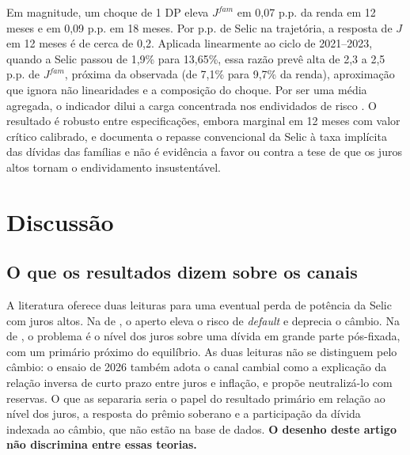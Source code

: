\documentclass[12pt,a4paper]{article}
\begin{document}
Em magnitude, um choque de 1 DP eleva $J^{fam}$ em 0,07 p.p. da renda em 12 meses e em 0,09 p.p. em 18 meses. Por p.p. de Selic na trajetória, a resposta de $J$ em 12 meses é de cerca de 0,2. Aplicada linearmente ao ciclo de 2021--2023, quando a Selic passou de 1,9\% para 13,65\%, essa razão prevê alta de 2,3 a 2,5 p.p. de $J^{fam}$, próxima da observada (de 7,1\% para 9,7\% da renda), aproximação que ignora não linearidades e a composição do choque. Por ser uma média agregada, o indicador dilui a carga concentrada nos endividados de risco \citep{bcb2020ee80}. O resultado é robusto entre especificações, embora marginal em 12 meses com valor crítico calibrado, e documenta o repasse convencional da Selic à taxa implícita das dívidas das famílias e não é evidência a favor ou contra a tese de que os juros altos tornam o endividamento insustentável.

\section{Discussão}

\subsection{O que os resultados dizem sobre os canais}

A literatura oferece duas leituras para uma eventual perda de potência da Selic com juros altos. Na de \citet{blanchard2005fiscal}, o aperto eleva o risco de \textit{default} e deprecia o câmbio. Na de \citet{resende2026euacuso}, o problema é o nível dos juros sobre uma dívida em grande parte pós-fixada, com um primário próximo do equilíbrio. As duas leituras não se distinguem pelo câmbio: o ensaio de 2026 também adota o canal cambial como a explicação da relação inversa de curto prazo entre juros e inflação, e propõe neutralizá-lo com reservas. O que as separaria seria o papel do resultado primário em relação ao nível dos juros, a resposta do prêmio soberano e a participação da dívida indexada ao câmbio, que não estão na base de dados. \textbf{O desenho deste artigo não discrimina entre essas teorias.}
\end{document}
